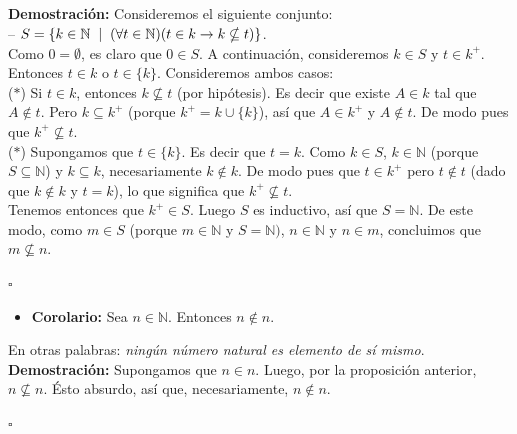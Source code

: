 \documentclass[10 pt]{article}
\begin{document}
{\Large{\textbf{Demostración:} Consideremos el siguiente conjunto: \\

-- $S=\{k \in \mathbb N \hspace{0.2 cm}|\hspace{0.2 cm}(\forall t \in \mathbb N)(t \in k \rightarrow k \nsubseteq t)\}$. \\

Como $0=\emptyset$, es claro que $0 \in S$. A continuación, consideremos $k \in S$ y $t \in k^+$. Entonces $t \in k$ o $t \in \{k\}$. Consideremos ambos casos: \\

($\ast$) Si $t \in k$, entonces $k \nsubseteq t$ (por hipótesis). Es decir que existe $A \in k$ tal que $A \notin t$. Pero $k \subseteq k^+$ (porque $k^+=k \cup \{k\}$), así que $A \in k^+$ y $A \notin t$. De modo pues que $k^+ \nsubseteq t$. \\

($\ast$) Supongamos que $t \in \{k\}$. Es decir que $t=k$. Como $k \in S$, $k \in \mathbb N$ (porque $S \subseteq \mathbb N$) y $k \subseteq k$, necesariamente $k \notin k$. De modo pues que $t \in k^+$ pero $t \notin t$ (dado que $k \notin k$ y $t=k$), lo que significa que $k^+ \nsubseteq t$. \\

Tenemos entonces que $k^+ \in S$. Luego $S$ es inductivo, así que $S=\mathbb N$. De este modo, como $m \in S$ (porque $m \in \mathbb N$ y $S=\mathbb N)$, $n \in \mathbb N$ y $n \in m$, concluimos que $m \nsubseteq n$.} \\

\begin{flushright}
    $\square$
\end{flushright}

\begin{itemize}
    \item \Large{\textbf{Corolario:} Sea $n \in \mathbb N$. Entonces $n \notin n$.} \\
\end{itemize}

\Large{En otras palabras: \textit{ningún número natural es elemento de sí mismo}.} \\

\Large{\textbf{Demostración:} Supongamos que $n \in n$. Luego, por la proposición anterior, $n \nsubseteq n$. Ésto absurdo, así que, necesariamente, $n \notin n$.} \\

\begin{flushright}
    $\square$
\end{flushright}

}
\end{document}

